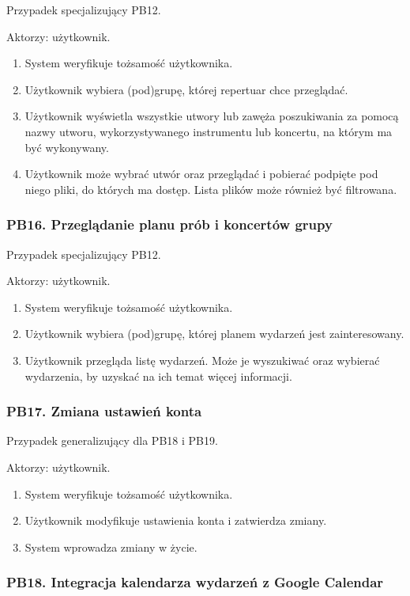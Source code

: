 \documentclass[11pt,a4paper]{article}
\renewcommand{\_}{\char`_}
\begin{document}
Przypadek specjalizujący PB12.

Aktorzy: użytkownik.
\begin{enumerate}
    \item System weryfikuje tożsamość użytkownika.
    \item Użytkownik wybiera (pod)grupę, której repertuar chce przeglądać.
    \item Użytkownik wyświetla wszystkie utwory lub zawęża poszukiwania za pomocą nazwy utworu, wykorzystywanego instrumentu lub koncertu, na którym ma być wykonywany.
    \item Użytkownik może wybrać utwór oraz przeglądać i pobierać podpięte pod niego pliki, do których ma dostęp. Lista plików może również być filtrowana.
\end{enumerate}

\subsubsection{PB16. Przeglądanie planu prób i koncertów grupy}

Przypadek specjalizujący PB12.

Aktorzy: użytkownik.
\begin{enumerate}
    \item System weryfikuje tożsamość użytkownika.
    \item Użytkownik wybiera (pod)grupę, której planem wydarzeń jest zainteresowany.
    \item Użytkownik przegląda listę wydarzeń. Może je wyszukiwać oraz wybierać wydarzenia, by uzyskać na ich temat więcej informacji.
\end{enumerate}

\subsubsection{PB17. Zmiana ustawień konta}

Przypadek generalizujący dla PB18 i PB19.

Aktorzy: użytkownik.
\begin{enumerate}
    \item System weryfikuje tożsamość użytkownika.
    \item Użytkownik modyfikuje ustawienia konta i zatwierdza zmiany.
    \item System wprowadza zmiany w życie.
\end{enumerate}

\subsubsection{PB18. Integracja kalendarza wydarzeń z Google Calendar}
\end{document}
